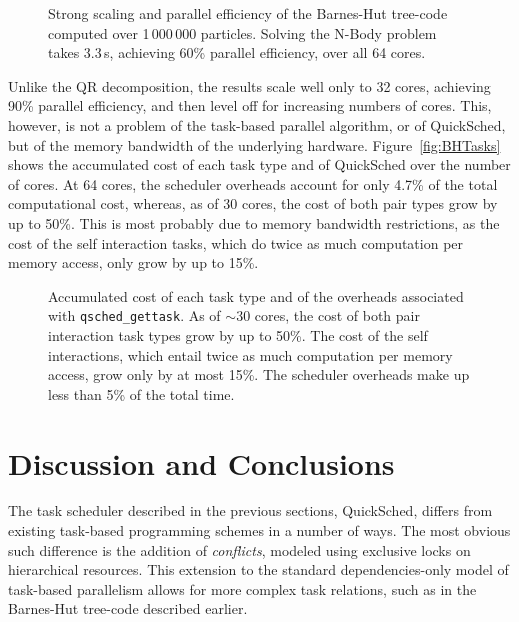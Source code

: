 \documentclass[preprint]{elsarticle}
\newcommand{\fig}[1]
    {Figure~\ref{fig:#1}}
\begin{document}
\begin{figure}
    \centerline{}
    \caption{Strong scaling and parallel efficiency of the Barnes-Hut tree-code
        computed over 1\,000\,000 particles.
        Solving the N-Body problem takes 3.3\,s, achieving 60\% parallel
        efficiency, over all 64 cores.
        }
    \label{fig:BHResults}
\end{figure}

Unlike the QR decomposition, the results scale well only to
32 cores, achieving 90\% parallel efficiency, and then
level off for increasing numbers of cores.
This, however, is not a problem of the task-based parallel
algorithm, or of QuickSched, but of the memory bandwidth
of the underlying hardware.
\fig{BHTasks} shows the accumulated cost of each task type and of 
QuickSched over the number of cores.
At 64 cores, the scheduler overheads account for only 4.7\% of
the total computational cost, whereas,
as of 30 cores, the cost of both pair types grow by up to
50\%.
This is most probably due to memory bandwidth restrictions, as
the cost of the self interaction tasks, which do twice as much
computation per memory access, only grow by up to 15\%.

\begin{figure}
    \centerline{}
    \caption{Accumulated cost of each task type and of the overheads
        associated with {\tt qsched\_gettask}.
        As of $\sim 30$ cores, the cost of both pair interaction task
        types grow by up to 50\%.
        The cost of the self interactions, which entail twice as much
        computation per memory access, grow only by at most 15\%.
        The scheduler overheads make up less than 5\% of the total
        time.
        }
    \label{fig:BHTimes}
\end{figure}


\section{Discussion and Conclusions}

The task scheduler described in the previous sections, QuickSched,
differs from existing task-based programming schemes
in a number of ways.
The most obvious such difference is the addition of {\em conflicts},
modeled using exclusive locks on hierarchical resources.
This extension to the standard dependencies-only model
of task-based parallelism allows for more complex task relations,
such as in the Barnes-Hut tree-code described earlier.
\end{document}
